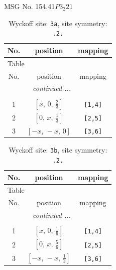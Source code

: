 \documentclass[fleqn,8pt]{jsarticle}
\begin{document}
\setcounter{MaxMatrixCols}{32}

\renewcommand{\tablename}{Table~}
\renewcommand{\figurename}{Figure~}
\begin{center}
\LARGE
MSG No. 154.41\quad$P3_{2}21$
\end{center}
\renewcommand{\arraystretch}{1.2}
\begin{longtable}{ccc}
\caption{Wyckoff site: {\tt 3a}, site symmetry: {\tt .2.}}
 \\
 \hline \hline
No. & position & mapping \\ \hline \endfirsthead

\multicolumn{2}{l}{\tablename\ \thetable{}} \\
 \hline \hline
No. & position & mapping \\ \hline \endhead

 \hline \hline
\multicolumn{2}{r}{\footnotesize\it continued ...} \\ \endfoot

 \hline \hline
\multicolumn{2}{r}{} \\ \endlastfoot

1 & $\left[ x,\, 0,\, \frac{2}{3} \right]$ & {\tt [1,4]} \\ \hline
2 & $\left[ 0,\, x,\, \frac{1}{3} \right]$ & {\tt [2,5]} \\ \hline
3 & $\left[ - x,\, - x,\, 0 \right]$ & {\tt [3,6]} \\
\end{longtable}
\renewcommand{\arraystretch}{1.2}
\begin{longtable}{ccc}
\caption{Wyckoff site: {\tt 3b}, site symmetry: {\tt .2.}}
 \\
 \hline \hline
No. & position & mapping \\ \hline \endfirsthead

\multicolumn{2}{l}{\tablename\ \thetable{}} \\
 \hline \hline
No. & position & mapping \\ \hline \endhead

 \hline \hline
\multicolumn{2}{r}{\footnotesize\it continued ...} \\ \endfoot

 \hline \hline
\multicolumn{2}{r}{} \\ \endlastfoot

1 & $\left[ x,\, 0,\, \frac{1}{6} \right]$ & {\tt [1,4]} \\ \hline
2 & $\left[ 0,\, x,\, \frac{5}{6} \right]$ & {\tt [2,5]} \\ \hline
3 & $\left[ - x,\, - x,\, \frac{1}{2} \right]$ & {\tt [3,6]} \\
\end{longtable}
\end{document}
